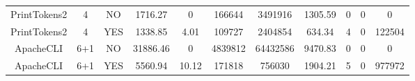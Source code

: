 \begin{table*}[]
\begin{tabular}{@{}ccccccccccc@{}}
        PrintTokens2                                             & 4                                                         & NO                                                                 & 1716.27                                                         & 0                                                                        & 166644                                                     & 3491916                                                       & 1305.59                                                       & 0                                                           & 0                                                                    & 0                                                                    \\
        PrintTokens2                                             & 4                                                         & YES                                                                & 1338.85                                                         & 4.01                                                                     & 109727                                                     & 2404854                                                       & 634.34                                                        & 4                                                           & 0                                                                    & 122504                                                               \\ \midrule
        ApacheCLI                                                & 6+1                                                       & NO                                                                 & 31886.46                                                        & 0                                                                        & 4839812                                                    & 64432586                                                      & 9470.83                                                       & 0                                                           & 0                                                                    & 0                                                                    \\
        ApacheCLI                                                & 6+1                                                       & YES                                                                & 5560.94                                                         & 10.12                                                                    & 171818                                                     & 756030                                                        & 1904.21                                                       & 5                                                           & 0                                                                    & 977972                                                               \\ \midrule

\end{tabular}
\end{table*}
